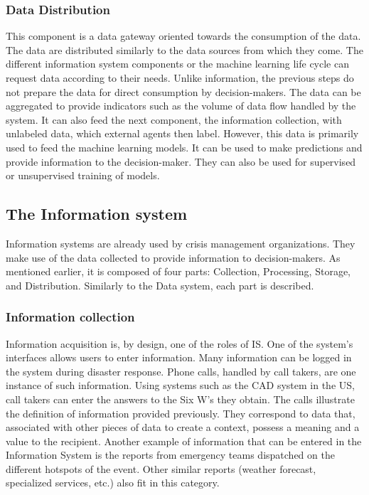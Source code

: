 \subsubsection{Data Distribution}
This component is a data gateway oriented towards the consumption of the data.
The data are distributed similarly to the data sources from which they come.
The different information system components or the machine learning life cycle can request data according to their needs.
Unlike information, the previous steps do not prepare the data for direct consumption by decision-makers.
The data can be aggregated to provide indicators such as the volume of data flow handled by the system.
It can also feed the next component, the information collection, with unlabeled data, which external agents then label.
However, this data is primarily used to feed the machine learning models.
It can be used to make predictions and provide information to the decision-maker.
They can also be used for supervised or unsupervised training of models.

\subsection{The Information system}
Information systems are already used by crisis management organizations.
They make use of the data collected to provide information to decision-makers.
As mentioned earlier, it is composed of four parts: Collection, Processing, Storage, and Distribution.
Similarly to the Data system, each part is described.

\subsubsection{Information collection}
Information acquisition is, by design, one of the roles of IS.
One of the system's interfaces allows users to enter information.
Many information can be logged in the system during disaster response.
Phone calls, handled by call takers, are one instance of such information.
Using systems such as the CAD system in the US, call takers can enter the answers to the
Six W's they obtain.
The calls illustrate the definition of information provided previously.
They correspond to data that, associated with other pieces of data to create a context, possess a meaning and a value to the recipient.
Another example of information that can be entered in the Information System is the reports from emergency teams dispatched on the different hotspots of the event.
Other similar reports (weather forecast, specialized services, etc.) also fit in this category.

